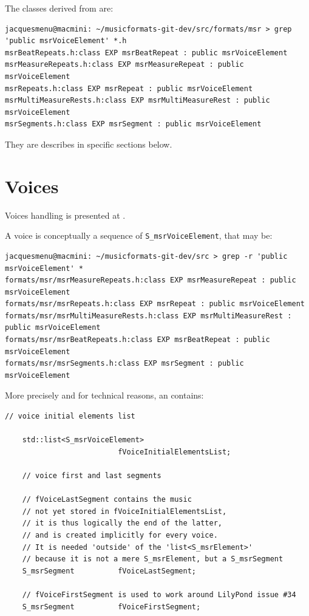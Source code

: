 The classes derived from  are:
\begin{lstlisting}[language=Terminal]
jacquesmenu@macmini: ~/musicformats-git-dev/src/formats/msr > grep 'public msrVoiceElement' *.h
msrBeatRepeats.h:class EXP msrBeatRepeat : public msrVoiceElement
msrMeasureRepeats.h:class EXP msrMeasureRepeat : public msrVoiceElement
msrRepeats.h:class EXP msrRepeat : public msrVoiceElement
msrMultiMeasureRests.h:class EXP msrMultiMeasureRest : public msrVoiceElement
msrSegments.h:class EXP msrSegment : public msrVoiceElement
\end{lstlisting}

They are describes in specific sections below.


\section{Voices}\label{Voices}

Voices handling is presented at .

A voice is conceptually a sequence of {\tt S_msrVoiceElement}, that may be:
\begin{lstlisting}[language=Terminal]
jacquesmenu@macmini: ~/musicformats-git-dev/src > grep -r 'public msrVoiceElement' *
formats/msr/msrMeasureRepeats.h:class EXP msrMeasureRepeat : public msrVoiceElement
formats/msr/msrRepeats.h:class EXP msrRepeat : public msrVoiceElement
formats/msr/msrMultiMeasureRests.h:class EXP msrMultiMeasureRest : public msrVoiceElement
formats/msr/msrBeatRepeats.h:class EXP msrBeatRepeat : public msrVoiceElement
formats/msr/msrSegments.h:class EXP msrSegment : public msrVoiceElement
\end{lstlisting}

More precisely and for technical reasons, an  contains:
\begin{lstlisting}[language=CPlusPlus]
    // voice initial elements list

    std::list<S_msrVoiceElement>
                          fVoiceInitialElementsList;

    // voice first and last segments

    // fVoiceLastSegment contains the music
    // not yet stored in fVoiceInitialElementsList,
    // it is thus logically the end of the latter,
    // and is created implicitly for every voice.
    // It is needed 'outside' of the 'list<S_msrElement>'
    // because it is not a mere S_msrElement, but a S_msrSegment
    S_msrSegment          fVoiceLastSegment;

    // fVoiceFirstSegment is used to work around LilyPond issue #34
    S_msrSegment          fVoiceFirstSegment;
\end{lstlisting}

